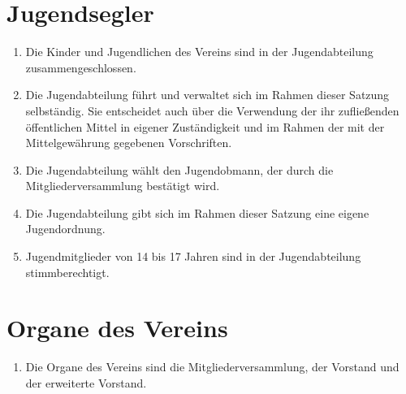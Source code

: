 \documentclass[10pt, twocolumn, parskip=half]{scrartcl}
\begin{document}
\section{Jugendsegler}
\begin{enumerate}[noitemsep]
	\item Die Kinder und Jugendlichen des Vereins sind in der Jugendabteilung zusammengeschlossen.
	\item Die Jugendabteilung führt und verwaltet sich im Rahmen dieser Satzung selbständig. Sie entscheidet auch über die Verwendung der ihr zufließenden öffentlichen Mittel in eigener Zuständigkeit und im Rahmen der mit der Mittelgewährung gegebenen Vorschriften.
	\item Die Jugendabteilung wählt den Jugendobmann, der durch die Mitgliederversammlung bestätigt wird.
	\item Die Jugendabteilung gibt sich im Rahmen dieser Satzung eine eigene Jugendordnung.
	\item Jugendmitglieder von 14 bis 17 Jahren sind in der Jugendabteilung stimmberechtigt.
\end{enumerate}

\section{Organe des Vereins}
\begin{enumerate}[noitemsep]
	\item  Die Organe des Vereins sind die Mitgliederversammlung, der Vorstand und der erweiterte Vorstand.
\end{enumerate}
\end{document}
